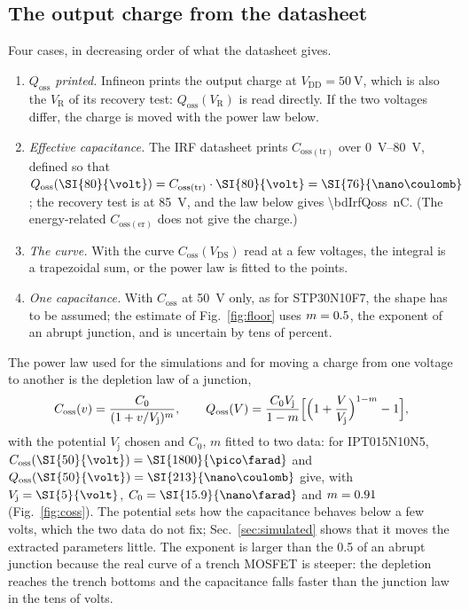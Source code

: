 \documentclass[10pt,a4paper]{scrartcl}
\newcommand{\VR}{V_\mathrm{R}}
\newcommand{\Qoss}{Q_\mathrm{oss}}
\newcommand{\Coss}{C_\mathrm{oss}}
\newcommand{\VDS}{V_\mathrm{DS}}
\newcommand{\Vj}{V_\mathrm{j}}
\newcommand{\Czero}{C_0}
\newcommand{\IPT}{IPT015N10N5}
\newcommand{\STP}{STP30N10F7}
\begin{document}
\subsection{The output charge from the datasheet}
\label{sec:qoss}
Four cases, in decreasing order of what the datasheet gives.
\begin{enumerate}
\item \emph{$\Qoss$ printed.} Infineon prints the output charge at $V_\mathrm{DD} = \SI{50}{\volt}$, which is also the $\VR$ of its recovery test: $\Qoss(\VR)$ is read directly. If the two voltages differ, the charge is moved with the power law below.
\item \emph{Effective capacitance.} The IRF datasheet prints $C_\mathrm{oss(tr)}$ over \SIrange{0}{80}{\volt}, defined so that $\Qoss(\SI{80}{\volt}) = C_\mathrm{oss(tr)}\cdot\SI{80}{\volt} = \SI{\bdIrfQossEighty}{\nano\coulomb}$; the recovery test is at \SI{85}{\volt}, and the law below gives \SI{\bdIrfQoss}{\nano\coulomb}. (The energy-related $C_\mathrm{oss(er)}$ does not give the charge.)
\item \emph{The curve.} With the curve $\Coss(\VDS)$ read at a few voltages, the integral is a trapezoidal sum, or the power law is fitted to the points.
\item \emph{One capacitance.} With $\Coss$ at \SI{50}{\volt} only, as for \STP{}, the shape has to be assumed; the estimate of Fig.~\ref{fig:floor} uses $m = 0.5$, the exponent of an abrupt junction, and is uncertain by tens of percent.
\end{enumerate}
The power law used for the simulations and for moving a charge from one voltage to another is the depletion law of a junction,
\begin{equation}
\Coss(v) = \frac{\Czero}{(1 + v/\Vj)^m} , \qquad \Qoss(V) = \frac{\Czero\Vj}{1-m}\Bigl[\Bigl(1+\frac{V}{\Vj}\Bigr)^{1-m} - 1\Bigr] ,
\label{eq:cosslaw}
\end{equation}
with the potential $\Vj$ chosen and $\Czero$, $m$ fitted to two data: for \IPT{}, $\Coss(\SI{50}{\volt}) = \SI{\bdIptCoss}{\pico\farad}$ and $\Qoss(\SI{50}{\volt}) = \SI{\bdIptQoss}{\nano\coulomb}$ give, with $\Vj = \SI{\bdIptVj}{\volt}$, $\Czero = \SI{\bdIptCzero}{\nano\farad}$ and $m = 0.91$ (Fig.~\ref{fig:coss}). The potential sets how the capacitance behaves below a few volts, which the two data do not fix; Sec.~\ref{sec:simulated} shows that it moves the extracted parameters little. The exponent is larger than the 0.5 of an abrupt junction because the real curve of a trench MOSFET is steeper: the depletion reaches the trench bottoms and the capacitance falls faster than the junction law in the tens of volts.
\end{document}
